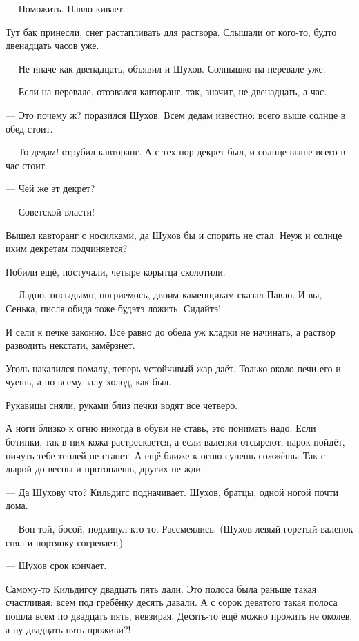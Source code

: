 --- Поможить. \dash Павло кивает.

Тут бак принесли, снег растапливать для раствора. Слышали от кого-то, будто двенадцать часов
уже.

--- Не иначе как двенадцать, \dash объявил и Шухов. \Dash Солнышко на перевале уже.

--- Если на перевале, \dash отозвался кавторанг, \Dash так, значит, не двенадцать, а час.

--- Это почему ж? \dash поразился Шухов. \Dash Всем дедам известно: всего выше солнце в обед стоит.

--- То \dash дедам! \dash отрубил кавторанг. \Dash А с тех пор декрет был, и солнце выше всего в час стоит.

--- Чей же эт декрет?

--- Советской власти!

Вышел кавторанг с носилками, да Шухов бы и спорить не стал. Неуж и солнце ихим декретам
подчиняется?

Побили ещё, постучали, четыре корытца сколотили.

--- Ладно, посыдымо, погриемось, \dash двоим каменщикам сказал Павло. \Dash И вы, Сенька, писля обида
тоже будэтэ ложить. Сидайтэ!

И \dash сели к печке законно. Всё равно до обеда уж кладки не начинать, а раствор разводить
некстати, замёрзнет.

Уголь накалился помалу, теперь устойчивый жар даёт. Только около печи его и чуешь, а по всему
залу \dash холод, как был.

Рукавицы сняли, руками близ печки водят все четверо.

А ноги близко к огню никогда в обуви не ставь, это понимать надо. Если ботинки, так в них кожа
растрескается, а если валенки \dash отсыреют, парок пойдёт, ничуть тебе теплей не станет. А ещё
ближе к огню сунешь \dash сожжёшь. Так с дырой до весны и протопаешь, других не жди.

--- Да Шухову что? \dash Кильдигс подначивает. \Dash Шухов, братцы, одной ногой почти дома.

--- Вон той, босой, \dash подкинул кто-то. Рассмеялись. (Шухов левый горетый валенок снял и
портянку согревает.)

--- Шухов срок кончает.

Самому-то Кильдигсу двадцать пять дали. Это полоса была раньше такая счастливая: всем под
гребёнку десять давали. А с сорок девятого такая полоса пошла \dash всем по двадцать пять,
невзирая. Десять-то ещё можно прожить не околев, \dash а ну двадцать пять проживи?!

